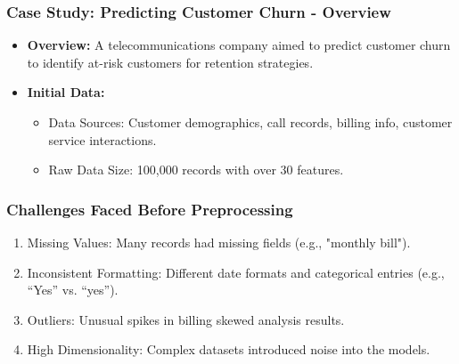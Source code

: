 \documentclass[aspectratio=169]{beamer}
\begin{document}
\begin{frame}[fragile]
    \frametitle{Case Study: Predicting Customer Churn - Overview}
    \begin{itemize}
        \item \textbf{Overview:} A telecommunications company aimed to predict customer churn to identify at-risk customers for retention strategies.
        \item \textbf{Initial Data:}
        \begin{itemize}
            \item Data Sources: Customer demographics, call records, billing info, customer service interactions.
            \item Raw Data Size: 100,000 records with over 30 features.
        \end{itemize}
    \end{itemize}
\end{frame}

\begin{frame}[fragile]
    \frametitle{Challenges Faced Before Preprocessing}
    \begin{enumerate}
        \item Missing Values: Many records had missing fields (e.g., "monthly bill").
        \item Inconsistent Formatting: Different date formats and categorical entries (e.g., “Yes” vs. “yes”).
        \item Outliers: Unusual spikes in billing skewed analysis results.
        \item High Dimensionality: Complex datasets introduced noise into the models.
    \end{enumerate}
\end{frame}
\end{document}
